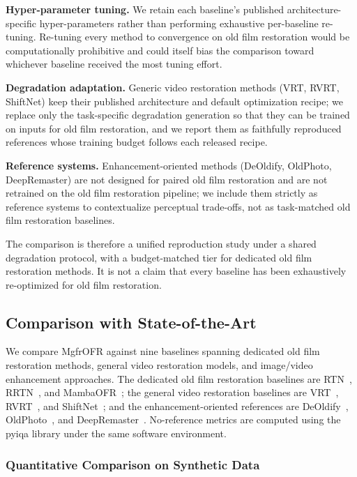 \textbf{Hyper-parameter tuning.} We retain each baseline's published architecture-specific hyper-parameters rather than performing exhaustive per-baseline re-tuning. Re-tuning every method to convergence on old film restoration would be computationally prohibitive and could itself bias the comparison toward whichever baseline received the most tuning effort.

\textbf{Degradation adaptation.} Generic video restoration methods (VRT, RVRT, ShiftNet) keep their published architecture and default optimization recipe; we replace only the task-specific degradation generation so that they can be trained on inputs for old film restoration, and we report them as faithfully reproduced references whose training budget follows each released recipe.

\textbf{Reference systems.} Enhancement-oriented methods (DeOldify, OldPhoto, DeepRemaster) are not designed for paired old film restoration and are not retrained on the old film restoration pipeline; we include them strictly as reference systems to contextualize perceptual trade-offs, not as task-matched old film restoration baselines.

The comparison is therefore a unified reproduction study under a shared degradation protocol, with a budget-matched tier for dedicated old film restoration methods. It is not a claim that every baseline has been exhaustively re-optimized for old film restoration.

\subsection{Comparison with State-of-the-Art}
\label{subsec:comparison_sota}

We compare MgfrOFR against nine baselines spanning dedicated old film restoration methods, general video restoration models, and image/video enhancement approaches. The dedicated old film restoration baselines are RTN~\cite{wan2022rtn}, RRTN~\cite{lin2024rrtn}, and MambaOFR~\cite{mao2025mambaofr}; the general video restoration baselines are VRT~\cite{liang2024vrt}, RVRT~\cite{liang2022rvrt}, and ShiftNet~\cite{li2023shiftnet}; and the enhancement-oriented references are DeOldify~\cite{jantic2019deoldify}, OldPhoto~\cite{wan2023oldphotopami}, and DeepRemaster~\cite{iizuka2019deepremaster}. No-reference metrics are computed using the pyiqa library under the same software environment.

\subsubsection{Quantitative Comparison on Synthetic Data}

